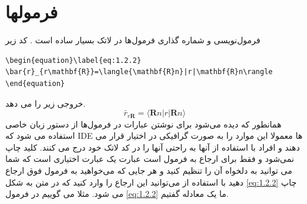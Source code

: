 \section{فرمولها}\label{seq:3.2}
فرمول‌نویسی و شماره گذاری فرمول‌ها در لاتک بسیار ساده است . کد زیر 
\begin{latin}
\begin{lstlisting}[style=Tex]
\begin{equation}\label{eq:1.2.2}
\bar{r}_{r\mathbf{R}}=\langle{\mathbf{R}n}|r|\mathbf{R}n\rangle
\end{equation}
\end{lstlisting}
\end{latin}
خروجی زیر را می دهد.
\begin{equation}\label{eq:1.2.2}
\bar{r}_{r\mathbf{R}}=\langle{\mathbf{R}n}|r|\mathbf{R}n\rangle
\end{equation}
همانطور که دیده می‌شود  برای نوشتن عبارات در فرمول‌ها از دستور زبان خاصی استفاده می شود که IDE ها معمولا این موارد را به صورت گرافیکی در اختیار قرار می دهند و افراد با استفاده از آنها به راحتی آنها را  در کد لاتک خود درج می کنند.  کلید 
چاپ نمی‌شود و فقط برای ارجاع به فرمول است عبارت  یک عبارت اختیاری است که شما می توانید به دلخواه آن را تنظیم کنید و هر جایی که می‌خواهید  به فرمول فوق ارجاع دهید با استفاده از 
 می‌توانید این ارجاع را وارد کنید که در متن به شکل \ref{eq:1.2.2} چاپ می شود. مثلا می گوییم در فرمول \ref{eq:1.2.2} ما یک معادله گفتیم.
 
